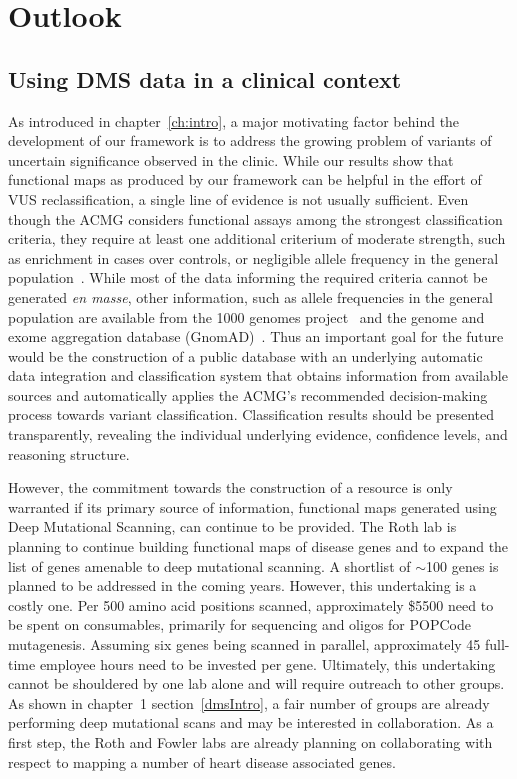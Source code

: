 \section{Outlook}

\subsection{Using DMS data in a clinical context}
As introduced in chapter~\ref{ch:intro}, a major motivating factor behind the development of our framework is to address the growing problem of variants of uncertain significance observed in the clinic. While our results show that functional maps as produced by our framework can be helpful in the effort of VUS reclassification, a single line of evidence is not usually sufficient. Even though the ACMG considers functional assays among the strongest classification criteria, they require at least one additional criterium of moderate strength, such as enrichment in cases over controls, or negligible allele frequency in the general population~\cite{richards_standards_2015}. While most of the data informing the required criteria cannot be generated \textit{en masse}, other information, such as allele frequencies in the general population are available from the 1000 genomes project~\cite{the_1000_genomes_project_consortium_global_2015} and the genome and exome aggregation database (GnomAD)~\cite{lek_analysis_2016}. Thus an important goal for the future would be the construction of a public database with an underlying automatic data integration and classification system that obtains information from available sources and automatically applies the ACMG's recommended decision-making process towards variant classification. Classification results should be presented transparently, revealing the individual underlying evidence, confidence levels, and reasoning structure. 

However, the commitment towards the construction of a resource is only warranted if its primary source of information, functional maps generated using Deep Mutational Scanning, can continue to be provided. The Roth lab is planning to continue building functional maps of disease genes and to expand the list of genes amenable to deep mutational scanning. A shortlist of $\sim$100 genes is planned to be addressed in the coming years. However, this undertaking is a costly one. Per 500 amino acid positions scanned, approximately \$5500 need to be spent on consumables, primarily for sequencing and oligos for POPCode mutagenesis. Assuming six genes being scanned in parallel, approximately 45 full-time employee hours need to be invested per gene. Ultimately, this undertaking cannot be shouldered by one lab alone and will require outreach to other groups. As shown in chapter~1 section~\ref{dmsIntro}, a fair number of groups are already performing deep mutational scans and may be interested in collaboration. As a first step, the Roth and Fowler labs are already planning on collaborating with respect to mapping a number of heart disease associated genes.

